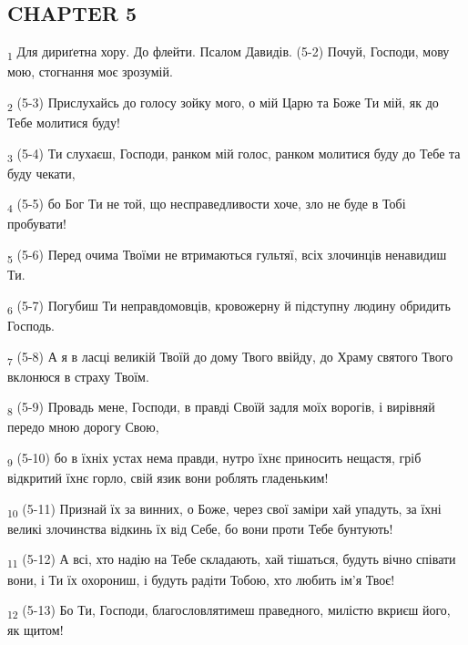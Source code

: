 \subsection{CHAPTER 5}
\begin{tcolorbox}
\textsubscript{1} Для дириґетна хору. До флейти. Псалом Давидів. (5-2) Почуй, Господи, мову мою, стогнання моє зрозумій.
\end{tcolorbox}
\begin{tcolorbox}
\textsubscript{2} (5-3) Прислухайсь до голосу зойку мого, о мій Царю та Боже Ти мій, як до Тебе молитися буду!
\end{tcolorbox}
\begin{tcolorbox}
\textsubscript{3} (5-4) Ти слухаєш, Господи, ранком мій голос, ранком молитися буду до Тебе та буду чекати,
\end{tcolorbox}
\begin{tcolorbox}
\textsubscript{4} (5-5) бо Бог Ти не той, що несправедливости хоче, зло не буде в Тобі пробувати!
\end{tcolorbox}
\begin{tcolorbox}
\textsubscript{5} (5-6) Перед очима Твоїми не втримаються гультяї, всіх злочинців ненавидиш Ти.
\end{tcolorbox}
\begin{tcolorbox}
\textsubscript{6} (5-7) Погубиш Ти неправдомовців, кровожерну й підступну людину обридить Господь.
\end{tcolorbox}
\begin{tcolorbox}
\textsubscript{7} (5-8) А я в ласці великій Твоїй до дому Твого ввійду, до Храму святого Твого вклонюся в страху Твоїм.
\end{tcolorbox}
\begin{tcolorbox}
\textsubscript{8} (5-9) Провадь мене, Господи, в правді Своїй задля моїх ворогів, і вирівняй передо мною дорогу Свою,
\end{tcolorbox}
\begin{tcolorbox}
\textsubscript{9} (5-10) бо в їхніх устах нема правди, нутро їхнє приносить нещастя, гріб відкритий їхнє горло, свій язик вони роблять гладеньким!
\end{tcolorbox}
\begin{tcolorbox}
\textsubscript{10} (5-11) Признай їх за винних, о Боже, через свої заміри хай упадуть, за їхні великі злочинства відкинь їх від Себе, бо вони проти Тебе бунтують!
\end{tcolorbox}
\begin{tcolorbox}
\textsubscript{11} (5-12) А всі, хто надію на Тебе складають, хай тішаться, будуть вічно співати вони, і Ти їх охорониш, і будуть радіти Тобою, хто любить ім'я Твоє!
\end{tcolorbox}
\begin{tcolorbox}
\textsubscript{12} (5-13) Бо Ти, Господи, благословлятимеш праведного, милістю вкриєш його, як щитом!
\end{tcolorbox}
